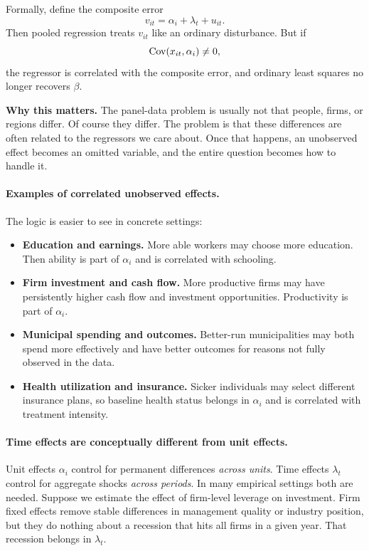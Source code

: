 Formally, define the composite error
\[
v_{it} = \alpha_i + \lambda_t + u_{it}.
\]
Then pooled regression treats $v_{it}$ like an ordinary disturbance. But if
\[
\operatorname{Cov}(x_{it},\alpha_i) \neq 0,
\]
the regressor is correlated with the composite error, and ordinary least squares no longer recovers $\beta$.

\begin{boxD}
\textbf{Why this matters.}
The panel-data problem is usually not that people, firms, or regions differ. Of course they differ. The problem is that these differences are often related to the regressors we care about. Once that happens, an unobserved effect becomes an omitted variable, and the entire question becomes how to handle it.
\end{boxD}

\paragraph{Examples of correlated unobserved effects.}
The logic is easier to see in concrete settings:
\begin{itemize}
\item \textbf{Education and earnings.} More able workers may choose more education. Then ability is part of $\alpha_i$ and is correlated with schooling.
\item \textbf{Firm investment and cash flow.} More productive firms may have persistently higher cash flow and investment opportunities. Productivity is part of $\alpha_i$.
\item \textbf{Municipal spending and outcomes.} Better-run municipalities may both spend more effectively and have better outcomes for reasons not fully observed in the data.
\item \textbf{Health utilization and insurance.} Sicker individuals may select different insurance plans, so baseline health status belongs in $\alpha_i$ and is correlated with treatment intensity.
\end{itemize}

\paragraph{Time effects are conceptually different from unit effects.}
Unit effects $\alpha_i$ control for permanent differences \emph{across units}. Time effects $\lambda_t$ control for aggregate shocks \emph{across periods}. In many empirical settings both are needed. Suppose we estimate the effect of firm-level leverage on investment. Firm fixed effects remove stable differences in management quality or industry position, but they do nothing about a recession that hits all firms in a given year. That recession belongs in $\lambda_t$.

